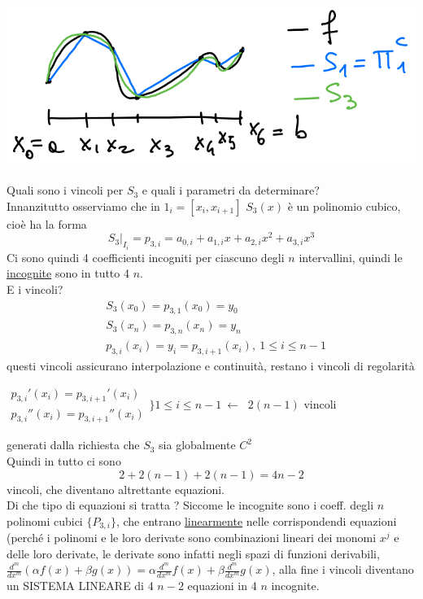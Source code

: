 \begin{center}
    \includegraphics[scale=0.4]{foto/img_pag23}
\end{center}
Quali sono i vincoli per $S_3$ e quali i parametri da determinare?\\
Innanzitutto osserviamo che in $1_i=[x_i,x_{i+1}]$ $S_3(x)$ è un polinomio cubico, cioè ha la forma 
\begin{equation*}
    S_3 \vert _{I_i} = p_{3,i} = a_{0,i} + a_{1,i}x + a_{2,i}x^2 + a_{3,i}x^3
\end{equation*}
Ci sono quindi 4 coefficienti incogniti per ciascuno degli $n$ intervallini, quindi le \uline{incognite} sono in tutto 4 $n$. \\
E i vincoli?
\begin{align*}
 & S_3(x_0)=p_{3,1}(x_0)=y_0 \\ 
 & S_3(x_n)=p_{3,n}(x_n)=y_n\\ 
 & p_{3,i}(x_i)=y_i=p_{3,i+1}(x_i), \ 1 \leq i \leq n-1 
\end{align*}
questi vincoli assicurano interpolazione e continuità, restano i vincoli di regolarità\\
\begin{center}
$\begin{matrix}
p_{3,i}'(x_i) = p_{3,i+1}'(x_i)\\
p_{3,i}''(x_i) = p_{3,i+1}''(x_i)
\end{matrix}$$\biggl\}1 \leq i \leq n-1 \ \longleftarrow \ $ $2(n-1)$ vincoli 
\end{center}
generati dalla richiesta che $S_3$ sia globalmente $C^2$\\ 
Quindi in tutto ci sono 
\begin{equation*}
    2 + 2(n-1) + 2(n-1) = 4n-2
\end{equation*}
vincoli, che diventano altrettante equazioni.\\
Di che tipo di equazioni si tratta ? Siccome le incognite sono i coeff. degli $n$ polinomi cubici $\{P_{3,i}\}$, che entrano \uline{linearmente} nelle corrispondendi equazioni (perché i polinomi e le loro derivate sono combinazioni lineari dei monomi $x^j$ e delle loro derivate, le derivate sono infatti negli spazi di funzioni derivabili, $\frac{d^m}{dx^m}(\alpha f(x) + \beta g(x)) = \alpha \frac{d^m}{dx^m} f(x) + \beta \frac{d^m}{dx^m} g(x) $, alla fine i vincoli diventano un SISTEMA LINEARE di 4 $n-2$ equazioni in 4 $n$ incognite. \\
